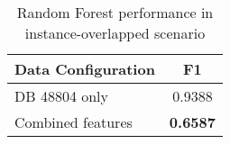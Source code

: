 \begin{table}[ht]
  \centering
  \caption{Random Forest performance in instance-overlapped scenario}
  \label{tab:vfl_random_forest_prediction_results}
  \begin{tabular}{lc}
  \toprule
  \textbf{Data Configuration} & \textbf{F1} \\
  \midrule
  DB 48804 only & 0.9388 \\
  Combined features & \textbf{0.6587} \\
  \bottomrule
  \end{tabular}
  \end{table}
